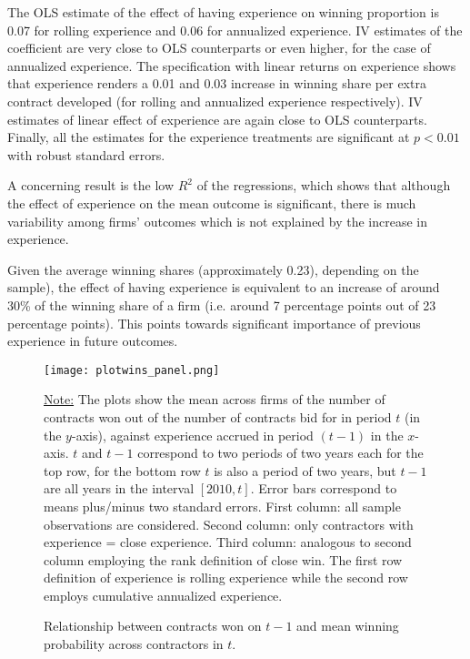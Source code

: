 The OLS estimate of the effect of having experience on winning proportion is 0.07 for rolling experience and 0.06 for annualized experience. IV estimates of the coefficient are very close to OLS counterparts or even higher, for the case of annualized experience. The specification with linear returns on experience shows that experience renders a 0.01 and 0.03 increase in winning share per extra contract developed (for rolling and annualized experience respectively). IV estimates of linear effect of experience are again close to OLS counterparts. Finally, all the estimates for the experience treatments are significant at $p<0.01$ with robust standard errors.

A concerning result is the low $R^2$ of the regressions, which shows that although the effect of experience on the mean outcome is significant, there is much variability among firms' outcomes which is not explained by the increase in experience.

Given the average winning shares (approximately 0.23), depending on the sample), the effect of having experience is equivalent to an increase of around 30\% of the winning share of a firm (i.e. around 7 percentage points out of 23 percentage points). This points towards significant importance of previous experience in future outcomes.


\begin{figure}
  \texttt{[image: plotwins\_panel.png]}
  \caption{Relationship between contracts won on $t-1$ and mean winning probability across contractors in $t$.}
  \label{fig:plotresults_both}
  \vskip 0.5mm
  { \footnotesize \underline{Note:} The plots show the mean across firms of the number of contracts won out of the number of contracts bid for in period $t$ (in the $y$-axis), against experience accrued in period $(t-1)$ in the $x$-axis. $t$ and $t-1$ correspond to two periods of two years each for the top row, for the bottom row $t$ is also a period of two years, but $t-1$ are all years in the interval $[2010,t]$. Error bars correspond to means plus/minus two standard errors. First column: all sample observations are considered. Second column: only contractors with experience = close experience. Third column: analogous to second column employing the rank definition of close win.  The first row definition of experience is rolling experience while the second row employs cumulative annualized experience.\par}
\end{figure}
\clearpage

